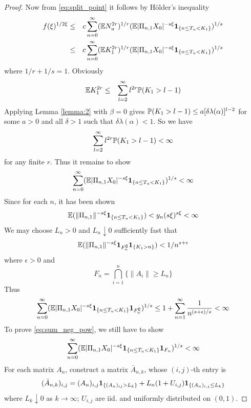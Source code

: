 \documentclass[aoas,preprint]{imsart}
\numberwithin{equation}{section}
\theoremstyle{plain}
\begin{document}
\begin{proof}
  Now from \eqref{eq:split_point} it follows by H\"older's inequality
  \begin{eqnarray*}
    f(\xi)^{1/2\xi}
    &\leq&
    c \sum_{n=0}^\infty
    (\E N_u^{2r})^{1/r}
    (\E |\Pi_{n, 1} X_0|^{-s\xi}\1{n \leq T_u < K_1})^{1/s} \\
    &\leq&
    c \sum_{n=0}^\infty
    (\E K_1^{2r})^{1/r}
    (\E |\Pi_{n, 1} X_0|^{-s\xi}\1{n \leq T_u < K_1})^{1/s}
  \end{eqnarray*}
  where $1/r + 1/s = 1$. Obviously
  \begin{eqnarray*}
    \E K_1^{2r}
    &\leq&
    \sum_{l=2}^\infty l^{2r} \P(K_1 > l-1)
  \end{eqnarray*}
  Applying Lemma \ref{lemma:2} with $\beta = 0$ gives $\P(K_1 >
  l-1) \leq a [\delta \lambda(\alpha)]^{l-2}$ for some $a > 0$ and
  all $\delta > 1$ such that $\delta \lambda(\alpha) < 1$. So we
  have
  \begin{eqnarray*}
    \sum_{l=2}^\infty l^{2r} \P(K_1 > l-1) < \infty
  \end{eqnarray*}
  for any finite $r$. Thus it remains to show
  \begin{equation}
    \label{eq:sum_neg_pow}
    \sum_{n=0}^\infty
    (\E |\Pi_{n, 1} X_0|^{-s\xi}\1{n \leq T_u < K_1})^{1/s}
    < \infty
  \end{equation}
  Since for each $n$, it has been shown
  \begin{equation*}
    \E (\|\Pi_{n, 1}\|^{-s\xi}\1{n \leq T_u < K_1})
    < y_n(s\xi)^{s\xi} < \infty
  \end{equation*}
  We may choose $L_n > 0$ and $L_n \downarrow 0$ sufficiently fast that
  \begin{equation*}
    \E (
    \|\Pi_{n, 1}\|^{-s\xi}
    \I_{F_n^\complement}
    \1{K_1 > n} 
    ) < {1 / n^{s+\epsilon}}
  \end{equation*}
  where $\epsilon > 0$ and
  \begin{equation*}
    F_n = \bigcap_{i=1}^n \{\|A_i\| \geq L_n\}
  \end{equation*}
  Thus
  \begin{equation*}
    \sum_{n=0}^\infty
    (\E |\Pi_{n, 1} X_0|^{-s\xi}\1{n \leq T_u < K_1}
    \I_{F_n^\complement})^{1/s}
    \leq
    1 + 
    \sum_{n=1}^\infty {1 \over n^{(s + \epsilon)/s}} < \infty
  \end{equation*}
  To prove \eqref{eq:sum_neg_pow}, we still have to show
  \begin{equation}
    \label{eq:sum_on_F_n}
    \sum_{n=0}^\infty
    (\E |\Pi_{n, 1} X_0|^{-s\xi}\1{n \leq T_u < K_1}
    \I_{F_n})^{1/s} < \infty
  \end{equation}
  For each matrix $A_n$, construct a matrix $\bar A_{n, k}$, whose
  $(i,j)$-th entry is
  \begin{equation*}
    (\bar A_{n,k})_{i,j} = (A_n)_{i,j}\1{(A_n)_{ij} > L_k} +
    L_n (1 + U_{i,j})\1{(A_n)_{i,j} \leq L_k}
  \end{equation*}
  where $L_k \downarrow 0$ as $k \to \infty$; $U_{i,j}$ are
  iid. and uniformly distributed on $(0,1)$.


\end{proof}
\end{document}
